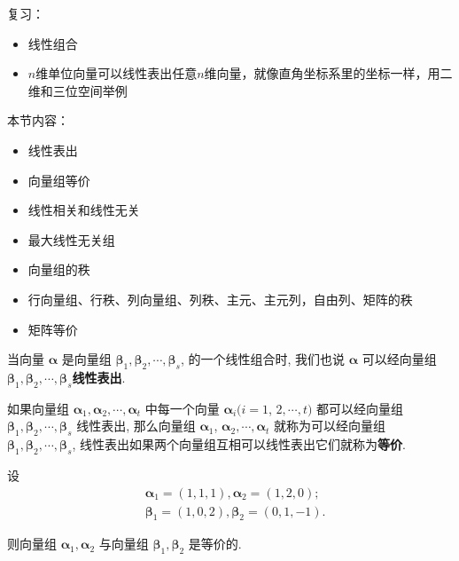 \begin{note}
    复习：
    \begin{itemize}
        \item 线性组合
        \item $n$维单位向量可以线性表出任意$n$维向量，就像直角坐标系里的坐标一样，用二维和三位空间举例
    \end{itemize}
    本节内容：
    \begin{itemize}
        \item 线性表出
        \item 向量组等价
        \item 线性相关和线性无关
        \item 最大线性无关组
        \item 向量组的秩
        \item 行向量组、行秩、列向量组、列秩、主元、主元列，自由列、矩阵的秩
        \item 矩阵等价
    \end{itemize}
\end{note}

\begin{definition}[线性表出]
    当向量 $\boldsymbol{\alpha}$ 是向量组 $\boldsymbol{\beta}_1, \boldsymbol{\beta}_2, \cdots, \boldsymbol{\beta}_s$, 的一个线性组合时, 我们也说 $\boldsymbol{\alpha}$ 可以经向量组 $\boldsymbol{\beta}_1, \boldsymbol{\beta}_2, \cdots, \boldsymbol{\beta}_s$\textcolor{third}{\bf 线性表出}.
\end{definition}

\begin{definition}[向量组等价]
    如果向量组 $\boldsymbol{\alpha}_1, \boldsymbol{\alpha}_2, \cdots, \boldsymbol{\alpha}_t$ 中每一个向量 $\boldsymbol{\alpha}_i(i=1$, $2, \cdots, t)$ 都可以经向量组 $\boldsymbol{\beta}_1, \boldsymbol{\beta}_2, \cdots, \boldsymbol{\beta}_s$ 线性表出, 那么向量组 $\boldsymbol{\alpha}_1$, $\boldsymbol{\alpha}_2, \cdots, \boldsymbol{\alpha}_t$ 就称为可以经向量组 $\boldsymbol{\beta}_1, \boldsymbol{\beta}_2, \cdots, \boldsymbol{\beta}_s$, 线性表出如果两个向量组互相可以线性表出它们就称为\textcolor{third}{\bf 等价}.
\end{definition}

\begin{exercise}
设
$$
\begin{aligned}
& \boldsymbol{\alpha}_1=(1,1,1), \boldsymbol{\alpha}_2=(1,2,0) ; \\
& \boldsymbol{\beta}_1=(1,0,2), \boldsymbol{\beta}_2=(0,1,-1) .
\end{aligned}
$$

则向量组 $\boldsymbol{\alpha}_1, \boldsymbol{\alpha}_2$ 与向量组 $\boldsymbol{\beta}_1, \boldsymbol{\beta}_2$ 是等价的.
\end{exercise}

